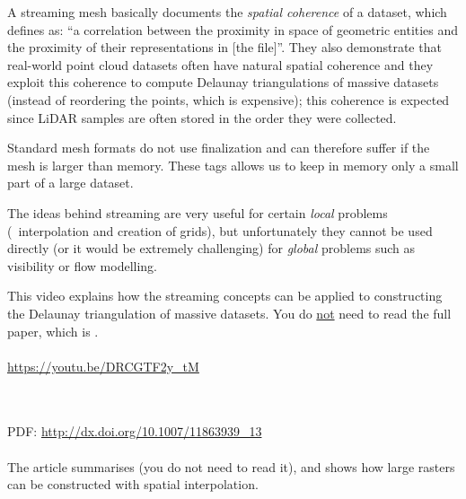 

A streaming mesh basically documents the \emph{spatial coherence}%
of a dataset, which \citet{Isenburg06} defines as: ``a correlation between the proximity in space of geometric entities and the proximity of their representations in [the file]''.
They also demonstrate that real-world point cloud datasets often have natural spatial coherence and they exploit this coherence to compute Delaunay triangulations of massive datasets (instead of reordering the points, which is expensive); this coherence is expected since LiDAR samples are often stored in the order they were collected.

Standard mesh formats do not use finalization and can therefore suffer if the mesh is larger than memory.
These tags allows us to keep in memory only a small part of a large dataset.


The ideas behind streaming are very useful for certain \emph{local} problems (\eg\ interpolation and creation of grids), but unfortunately they cannot be used directly (or it would be extremely challenging) for \emph{global} problems such as visibility or flow modelling.

\begin{kaobox-toread}[frametitle=\faExternalLink\ To read or to watch]
  This video explains how the streaming concepts can be applied to constructing the Delaunay triangulation of massive datasets.
  You do \underline{not} need to read the full paper, which is \citet{Isenburg06}.
  \\ \\
  \url{https://youtu.be/DRCGTF2y_tM}
\end{kaobox-toread}

\begin{kaobox-toread}[frametitle=\faExternalLink\ To read or to watch]
  \\ \\
  PDF: \url{http://dx.doi.org/10.1007/11863939_13}
  \\ \\
  The article summarises \citet{Isenburg06} (you do not need to read it), and shows how large rasters can be constructed with spatial interpolation.
\end{kaobox-toread}



